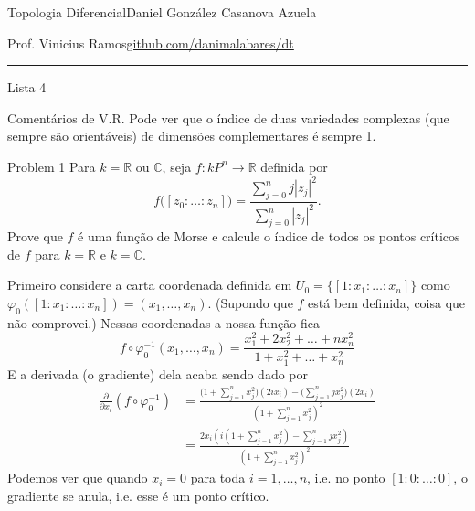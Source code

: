 
%




\begin{minipage}{\textwidth}
	\begin{minipage}{1\textwidth}
		Topologia Diferencial\hfill Daniel González Casanova Azuela
		
		{Prof. Vinicius Ramos\hfill\href{https://github.com/danimalabares/dt}{github.com/danimalabares/dt}}
	\end{minipage}
\end{minipage}\vspace{.2cm}\hrule

\vspace{10pt}
{\huge Lista 4}

\begin{thing6}{Comentários de V.R.}\leavevmode
Pode ver que o índice de duas variedades complexas (que sempre são orientáveis) de dimensões complementares é sempre 1.
\end{thing6}
\vspace{1em}

\begin{thing1}{Problem 1}\label{prob:1}\leavevmode
Para \(k=\mathbb{R}\) ou \(\mathbb{C}\), seja \(f: kP^n \longrightarrow \mathbb{R}\) definida por
\[f\Big([z_0:\ldots:z_n]\Big)=\frac{\sum_{j=0}^nj|z_j|^2}{\sum_{j=0}^n |z_j|^2}.\]
Prove que \(f\) é uma função de Morse e calcule o índice de todos os pontos críticos de \(f\) para  \(k=\mathbb{R}\) e \(k=\mathbb{C}\).
\end{thing1}

	 \iffalse Primeiro considere a carta coordenada definida em \(U_0=\{[1:x_1:\ldots:x_n]\}\) como \(\varphi_0([1:x_1:\ldots:x_n])=(x_1,\ldots,x_n)\). (Supondo que \(f\) está bem definida, coisa que não comprovei.) Nessas coordenadas a nossa função fica
	\[f \circ \varphi_0^{-1}(x_1,\ldots,x_n)=\frac{x_1^2+2x_2^2+\ldots+nx_n^2}{1+x_1^2+\ldots+x_n^2}\]
E a derivada (o gradiente) dela acaba sendo dado por
\begin{align*}\frac{\partial }{\partial x_i}(f \circ \varphi_0^{-1})&=\frac{\Big(1+\sum_{j=1}^n x_j^2\Big)(2ix_i)-\Big(\sum_{j=1}^njx_j^2\Big)(2x_i)}{\left(1+\sum_{j=1}^nx_j^2\right)^2 }\\
	&=\frac{2x_i\left(i \left(1+\sum_{j=1}^nx_j^2\right)-\sum_{j=1}^njx_j^2\right) }{\left(1+\sum_{j=1}^nx_j^2\right) ^2}
	\end{align*}
	Podemos ver que quando \(x_i=0\) para toda \(i=1,\ldots,n\), i.e. no ponto \([1:0:\ldots:0]\), o gradiente se anula, i.e. esse é um ponto crítico.

